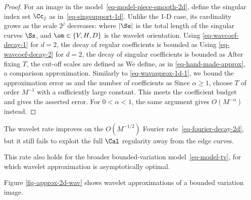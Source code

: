 \begin{proof}
For an image in the model~\eqref{eq-model-piece-smooth-2d}, define the singular index set $\Cc_j$ as in~\eqref{eq-singsupport-1d}. Unlike the 1-D case, its cardinality grows as the scale $2^j$ decreases:
where $|\Ss|$ is the total length of the singular curves $\Ss$, and $\om \in \{V,H,D\}$ is the wavelet orientation.
Using \eqref{eq-wavcoef-decay-1} for $d=2$, the decay of regular coefficients is bounded as
Using \eqref{eq-wavcoef-decay-2} for $d=2$, the decay of singular coefficients is bounded as
After fixing $T$, the cut-off scales are defined as 
We define, as in \eqref{eq-hand-made-approx}, a comparison approximation.
Similarly to \eqref{eq-wavapprox-1d-1}, we bound the approximation error as
and the number of coefficients as 
Since $\alpha\geq1$, choose $T$ of order $M^{-1}$ with a sufficiently large constant. This meets the coefficient budget and gives the asserted error. For $0<\alpha<1$, the same argument gives $O(M^{-\alpha})$ instead.
\end{proof}

The wavelet rate improves on the $O(M^{-1/2})$ Fourier rate~\eqref{eq-fourier-decay-2d}, but it still fails to exploit the full $\Cal$ regularity away from the edge curves.

This rate also holds for the broader bounded-variation model~\eqref{eq-model-tv}, for which wavelet approximation is asymptotically optimal.


Figure \ref{fig-approx-2d-wav} shows wavelet approximations of a bounded variation image. 




